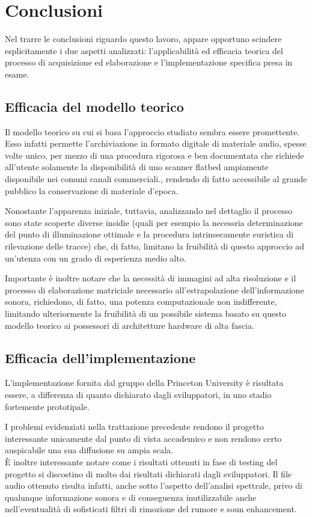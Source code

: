 \section{Conclusioni}
Nel trarre le conclusioni riguardo questo lavoro, appare opportuno scindere esplicitamente i due aspetti analizzati: l'applicabilit\`a ed efficacia teorica del processo di acquisizione ed elaborazione e l'implementazione specifica presa in esame.
\subsection{Efficacia del modello teorico}
Il modello teorico su cui si basa l'approccio studiato sembra essere promettente. Esso infatti permette l'archiviazione in formato digitale di materiale audio, spesse volte unico, per mezzo di una procedura rigorosa e ben documentata che richiede all'utente solamente la disponibilit\`a di uno scanner flatbed ampiamente disponibile nei comuni canali commerciali., rendendo di fatto accessibile al grande pubblico la conservazione di materiale d'epoca.

Nonostante l'apparenza iniziale, tuttavia, analizzando nel dettaglio il processo sono state scoperte diverse insidie (quali per esempio la necessria determinazione del punto di illuminazione ottimale e la procedura intrinsecamente euristica di rilevazione delle tracce) che, di fatto, limitano la fruibilit\`a di questo approccio ad un'utenza con un grado di esperienza medio alto. 

Importante \`e inoltre notare che la necessit\`a di immagini ad alta risoluzione e il processo di elaborazione matriciale necessario all'estrapolazione dell'informazione sonora, richiedono, di fatto, una potenza computazionale non indifferente, limitando ulteriormente la fruibilit\`a di un possibile sistema basato su questo modello teorico ai possessori di architetture hardware di alta fascia.

\subsection{Efficacia dell'implementazione}
L'implementazione fornita dal gruppo della Princeton University \`e risultata essere, a differenza di quanto dichiarato dagli sviluppatori, in uno stadio fortemente prototipale.

I problemi evidenziati nella trattazione precedente rendono il progetto interessante unicamente dal punto di vista accademico e non rendono certo auspicabile una sua diffusione su ampia scala.\\
\`E inoltre interessante notare come i risultati ottenuti in fase di testing del progetto si discostino di molto dai risultati dichiarati dagli sviluppatori. Il file audio ottenuto risulta infatti, anche sotto l'aspetto dell'analisi spettrale, privo di qualunque informazione sonora e di conseguenza inutilizzabile anche nell'eventualit\`a di sofisticati filtri di rimozione del rumore e soun enhancement.

